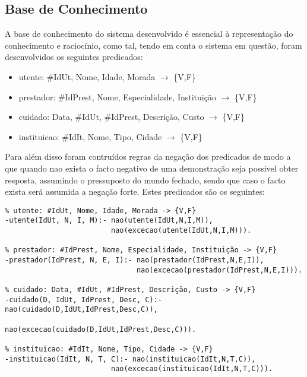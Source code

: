\documentclass{article}
\begin{document}
\subsection{Base de Conhecimento}
A base de conhecimento do sistema desenvolvido é essencial à representação do conhecimento e raciocínio, como tal, tendo em conta o sistema em questão, foram desenvolvidos os seguintes predicados:
\begin{itemize}
	\item utente: \#IdUt, Nome, Idade, Morada $\to$ \{V,F\}
    \item prestador: \#IdPrest, Nome, Especialidade, Instituição $\to$ \{V,F\}
    \item cuidado: Data, \#IdUt, \#IdPrest, Descrição, Custo $\to$ \{V,F\}
    \item instituicao: \#IdIt, Nome, Tipo, Cidade $\to$ \{V,F\}
\end{itemize}
Para além disso foram contruídos regras da negação dos predicados de modo a que quando nao exista o facto negativo de uma demonstração seja possivel obter resposta, assumindo o pressuposto do mundo fechado, sendo que caso o facto exista será assumida a negação forte. Estes predicados são os seguintes:
\begin{verbatim}
% utente: #IdUt, Nome, Idade, Morada -> {V,F}
-utente(IdUt, N, I, M):- nao(utente(IdUt,N,I,M)),
                         nao(excecao(utente(IdUt,N,I,M))).

% prestador: #IdPrest, Nome, Especialidade, Instituição -> {V,F}
-prestador(IdPrest, N, E, I):- nao(prestador(IdPrest,N,E,I)),
                               nao(excecao(prestador(IdPrest,N,E,I))).

% cuidado: Data, #IdUt, #IdPrest, Descrição, Custo -> {V,F}
-cuidado(D, IdUt, IdPrest, Desc, C):- nao(cuidado(D,IdUt,IdPrest,Desc,C)),
                                      nao(excecao(cuidado(D,IdUt,IdPrest,Desc,C))).

% instituicao: #IdIt, Nome, Tipo, Cidade -> {V,F}
-instituicao(IdIt, N, T, C):- nao(instituicao(IdIt,N,T,C)),
                         nao(excecao(instituicao(IdIt,N,T,C))).
\end{verbatim}
\end{document}
